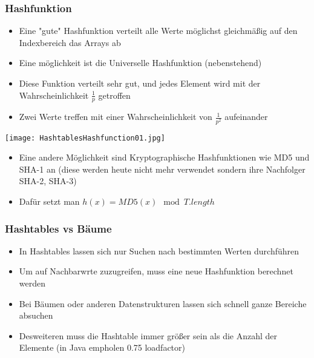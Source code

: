 		\subsubsection{Hashfunktion}
			\begin{minipage}{0.5\textwidth}
				\begin{itemize}
					\item Eine "gute" Hashfunktion verteilt alle Werte möglichst gleichmä\ss ig 
						auf den Indexbereich das Arrays ab
					\item Eine möglichkeit ist die Universelle Hashfunktion (nebenstehend)
					\item Diese Funktion verteilt sehr gut, und jedes Element wird mit der Wahrscheinlichkeit
						$\frac{1}{p}$ getroffen
					\item Zwei Werte treffen mit einer Wahrscheinlichkeit von $\frac{1}{p^2}$ aufeinander \\
				\end{itemize}
			\end{minipage}
			\hspace{1cm}
			\begin{minipage}{0.45\textwidth}
				\begin{center}
					\texttt{[image: HashtablesHashfunction01.jpg]}
				\end{center}
			\end{minipage}
			\begin{itemize}
				\item Eine andere Möglichkeit sind Kryptographische Hashfunktionen wie MD5 und SHA-1 an
				(diese werden heute nicht mehr verwendet sondern ihre Nachfolger SHA-2, SHA-3)
				\item Dafür setzt man $h(x) = MD5(x) \mod T.length$
			\end{itemize}


		\subsubsection{Hashtables vs Bäume}
			\begin{itemize}
				\item In Hashtables lassen sich nur Suchen nach bestimmten Werten durchführen
				\item Um auf Nachbarwrte zuzugreifen, muss eine neue Hashfunktion berechnet werden
				\item Bei Bäumen oder anderen Datenstrukturen lassen sich schnell ganze Bereiche absuchen
				\item Desweiteren muss die Hashtable immer grö\ss er sein als die Anzahl der Elemente (in Java empholen 0.75 loadfactor)
			\end{itemize}


